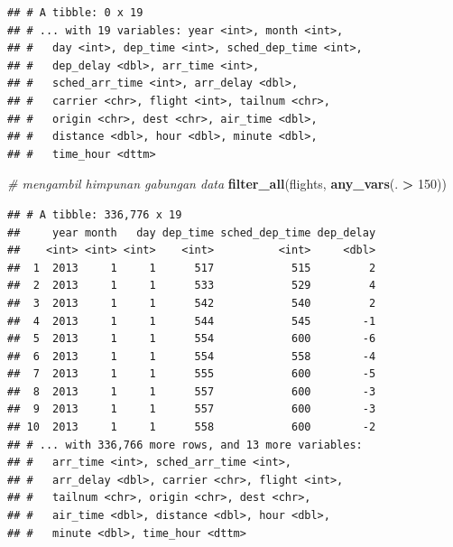 \documentclass[]{book}
\newenvironment{Shaded}{\begin{snugshade}}{\end{snugshade}}
\newcommand{\KeywordTok}[1]{\textcolor[rgb]{0.13,0.29,0.53}{\textbf{#1}}}
\newcommand{\DecValTok}[1]{\textcolor[rgb]{0.00,0.00,0.81}{#1}}
\newcommand{\StringTok}[1]{\textcolor[rgb]{0.31,0.60,0.02}{#1}}
\newcommand{\CommentTok}[1]{\textcolor[rgb]{0.56,0.35,0.01}{\textit{#1}}}
\newcommand{\OperatorTok}[1]{\textcolor[rgb]{0.81,0.36,0.00}{\textbf{#1}}}
\newcommand{\NormalTok}[1]{#1}
\begin{document}
\begin{verbatim}
## # A tibble: 0 x 19
## # ... with 19 variables: year <int>, month <int>,
## #   day <int>, dep_time <int>, sched_dep_time <int>,
## #   dep_delay <dbl>, arr_time <int>,
## #   sched_arr_time <int>, arr_delay <dbl>,
## #   carrier <chr>, flight <int>, tailnum <chr>,
## #   origin <chr>, dest <chr>, air_time <dbl>,
## #   distance <dbl>, hour <dbl>, minute <dbl>,
## #   time_hour <dttm>
\end{verbatim}

\begin{Shaded}
\begin{Highlighting}[]
\CommentTok{# mengambil himpunan gabungan data}
\KeywordTok{filter_all}\NormalTok{(flights, }\KeywordTok{any_vars}\NormalTok{(. }\OperatorTok{>}\StringTok{ }\DecValTok{150}\NormalTok{))}
\end{Highlighting}
\end{Shaded}

\begin{verbatim}
## # A tibble: 336,776 x 19
##     year month   day dep_time sched_dep_time dep_delay
##    <int> <int> <int>    <int>          <int>     <dbl>
##  1  2013     1     1      517            515         2
##  2  2013     1     1      533            529         4
##  3  2013     1     1      542            540         2
##  4  2013     1     1      544            545        -1
##  5  2013     1     1      554            600        -6
##  6  2013     1     1      554            558        -4
##  7  2013     1     1      555            600        -5
##  8  2013     1     1      557            600        -3
##  9  2013     1     1      557            600        -3
## 10  2013     1     1      558            600        -2
## # ... with 336,766 more rows, and 13 more variables:
## #   arr_time <int>, sched_arr_time <int>,
## #   arr_delay <dbl>, carrier <chr>, flight <int>,
## #   tailnum <chr>, origin <chr>, dest <chr>,
## #   air_time <dbl>, distance <dbl>, hour <dbl>,
## #   minute <dbl>, time_hour <dttm>
\end{verbatim}

\begin{Shaded}
\end{Shaded}
\end{document}
